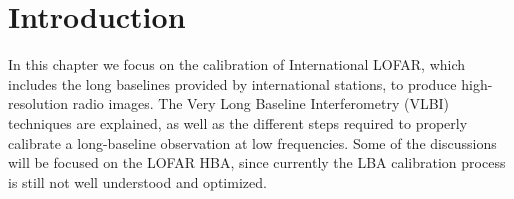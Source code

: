 \documentclass[graybox]{svmult}
\begin{document}

\section{Introduction}
\label{sec:introduction}

In this chapter we focus on the calibration of International LOFAR, which
includes the long baselines provided by international stations, to produce
high-resolution radio images. The Very Long Baseline Interferometry (VLBI)
techniques are explained, as well as the different steps required to properly
calibrate a long-baseline observation at low frequencies. Some of the
discussions will be focused on the LOFAR HBA, since currently the LBA
calibration process is still not well understood and optimized.

\end{document}
